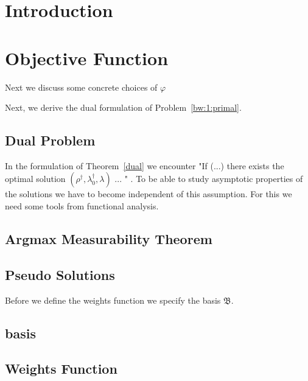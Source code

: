 \section{Introduction}


\section{Objective Function}


Next we discuss some concrete choices of $\varphi$




Next, we derive the dual formulation of Problem~\ref{bw:1:primal}.
\subsection{Dual Problem}



In the formulation of Theorem~\ref{dual} we encounter "If (...) there exists the optimal solution $(\rho^\dagger,\lambda_0^\dagger,\lambda)$ ... " .
To be able to study asymptotic properties of the solutions we have to become independent of this assumption.
For this we need some tools from functional analysis.
\subsection{Argmax Measurability Theorem}


%

%
\subsection{Pseudo Solutions}


Before we define the weights function we specify the basis $\mathfrak{B}$.
\subsection{basis}

\subsection{Weights Function}



